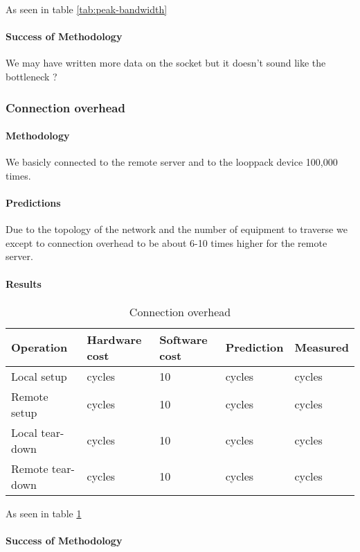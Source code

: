 As seen in table \ref{tab:peak-bandwidth}
\paragraph{Success of Methodology}
We may have written more data on the socket but it doesn't sound like the
bottleneck ?


\subsubsection{Connection overhead}
\paragraph{Methodology}
We basicly connected to the remote server and to the looppack device 100,000 times.

\paragraph{Predictions}
Due to the topology of the network and the number of equipment to traverse we
except to connection overhead to be about 6-10 times higher for the remote server.
\paragraph{Results}
\begin{table} [h]
\begin{center}
\begin{tabular}{| l | l | l | l | l |}
\hline
Operation & Hardware cost & Software cost & Prediction & Measured \\ \hline
Local setup 	&  cycles		& 10			&  cycles	&  cycles \\ \hline
Remote setup	&  cycles		& 10			&  cycles	&  cycles \\ \hline
Local tear-down 	&  cycles		& 10			&  cycles	&  cycles \\ \hline
Remote tear-down	&  cycles		& 10			&  cycles	&  cycles \\ \hline


\end{tabular}
\end{center}
\caption{Connection overhead\label{tab:connection-overhead}}
\end{table}

As seen in table \ref{tab:connection-overhead}

\paragraph{Success of Methodology}
